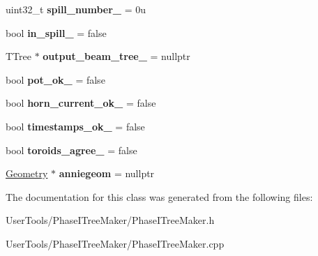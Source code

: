 \begin{DoxyCompactItemize}
\item 
\hypertarget{classPhaseITreeMaker_a9363a87ceae0d21c75e01db1df6cdd8a}{
uint32\_\-t {\bfseries spill\_\-number\_\-} = 0u}
\label{classPhaseITreeMaker_a9363a87ceae0d21c75e01db1df6cdd8a}

\item 
\hypertarget{classPhaseITreeMaker_a2abc635b4b7dd1049eb03aea068c727b}{
bool {\bfseries in\_\-spill\_\-} = false}
\label{classPhaseITreeMaker_a2abc635b4b7dd1049eb03aea068c727b}

\item 
\hypertarget{classPhaseITreeMaker_a6ed6473e4b74ba6eff55b1121f4bc3b1}{
TTree $\ast$ {\bfseries output\_\-beam\_\-tree\_\-} = nullptr}
\label{classPhaseITreeMaker_a6ed6473e4b74ba6eff55b1121f4bc3b1}

\item 
\hypertarget{classPhaseITreeMaker_adda325293e3d77024523c447761ff3a3}{
bool {\bfseries pot\_\-ok\_\-} = false}
\label{classPhaseITreeMaker_adda325293e3d77024523c447761ff3a3}

\item 
\hypertarget{classPhaseITreeMaker_ad22c1f1d5f83ed60d6cb8d4b38cd1a93}{
bool {\bfseries horn\_\-current\_\-ok\_\-} = false}
\label{classPhaseITreeMaker_ad22c1f1d5f83ed60d6cb8d4b38cd1a93}

\item 
\hypertarget{classPhaseITreeMaker_ae63bf72fba04f5334a75801b207b76a5}{
bool {\bfseries timestamps\_\-ok\_\-} = false}
\label{classPhaseITreeMaker_ae63bf72fba04f5334a75801b207b76a5}

\item 
\hypertarget{classPhaseITreeMaker_aaefb2a68be7c1f78577db8631680304a}{
bool {\bfseries toroids\_\-agree\_\-} = false}
\label{classPhaseITreeMaker_aaefb2a68be7c1f78577db8631680304a}

\item 
\hypertarget{classPhaseITreeMaker_a9f95ccc126493c05a7f4ee7a3da86fe2}{
\hyperlink{classGeometry}{Geometry} $\ast$ {\bfseries anniegeom} = nullptr}
\label{classPhaseITreeMaker_a9f95ccc126493c05a7f4ee7a3da86fe2}

\end{DoxyCompactItemize}


The documentation for this class was generated from the following files:\begin{DoxyCompactItemize}
\item 
UserTools/PhaseITreeMaker/PhaseITreeMaker.h\item 
UserTools/PhaseITreeMaker/PhaseITreeMaker.cpp\end{DoxyCompactItemize}
